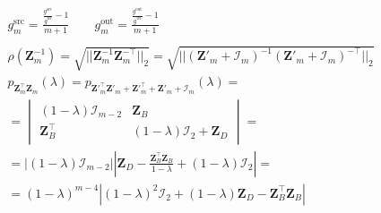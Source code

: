 \documentclass[journal,onecolumn]{IEEEtran}
\begin{document}
\begin{gather*}
        g^\text{src}_m = \frac{\frac{g^\text{src}}{g^{wl}} - 1}{m + 1} \qquad g^\text{out}_m = \frac{\frac{g^\text{out}}{g^{wl}} - 1}{m + 1} \\
        \\
        \rho(\mathbf{Z}^{-1}_{m}) = \sqrt{||\mathbf{Z}^{-1}_{m}\mathbf{Z}^{-\top}_{m}||_2} = \sqrt{||(\mathbf{Z'}^{}_{m} + \mathcal{I}^{}_{m})^{-1}(\mathbf{Z'}^{}_{m} + \mathcal{I}^{}_{m})^{-\top}||_2} \\
        p_{\mathbf{Z}^\top_{m}\mathbf{Z}^{}_{m}}(\lambda) = p_{\mathbf{Z'}^\top_{m}\mathbf{Z'}^{}_{m} + \mathbf{Z'}^\top_{m} + \mathbf{Z'}^{}_{m}  + \mathcal{I}^{}_{m}}(\lambda) = \\ = \begin{vmatrix} 
            (1 - \lambda)\mathcal{I}^{}_{m - 2} & \mathbf{Z}^{}_{B} \\
            \mathbf{Z}^\top_{B} & (1 - \lambda)\mathcal{I}^{}_{2} + \mathbf{Z}^{}_{D}
        \end{vmatrix} = \\ = \biggl| (1 - \lambda)\mathcal{I}_{m - 2} \biggr| \left|\mathbf{Z}^{}_{D} - \frac{\mathbf{Z}^\top_{B}\mathbf{Z}^{}_{B}}{1 - \lambda} + (1 - \lambda)\mathcal{I}^{}_{2} \right| = \\ = (1 - \lambda)^{m-4} \left| (1 - \lambda)^2\mathcal{I}^{}_{2} + (1 - \lambda) \mathbf{Z}^{}_{D} - \mathbf{Z}^\top_{B}\mathbf{Z}^{}_{B} \right|
    \end{gather*}
\end{document}
